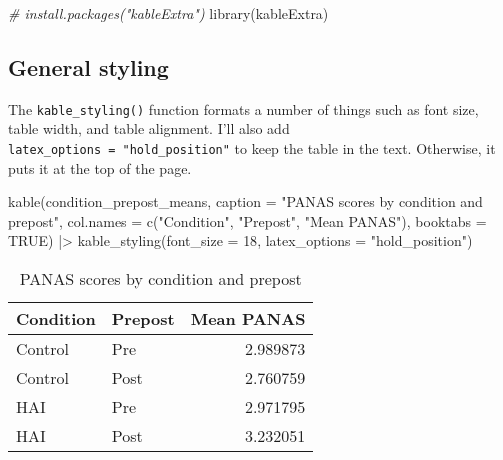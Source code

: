 \documentclass[
  doc]{apa6}
\newenvironment{Shaded}{\begin{snugshade}}{\end{snugshade}}
\newcommand{\AttributeTok}[1]{\textcolor[rgb]{0.77,0.63,0.00}{#1}}
\newcommand{\CommentTok}[1]{\textcolor[rgb]{0.56,0.35,0.01}{\textit{#1}}}
\newcommand{\ConstantTok}[1]{\textcolor[rgb]{0.00,0.00,0.00}{#1}}
\newcommand{\DecValTok}[1]{\textcolor[rgb]{0.00,0.00,0.81}{#1}}
\newcommand{\FunctionTok}[1]{\textcolor[rgb]{0.00,0.00,0.00}{#1}}
\newcommand{\NormalTok}[1]{#1}
\newcommand{\SpecialCharTok}[1]{\textcolor[rgb]{0.00,0.00,0.00}{#1}}
\newcommand{\StringTok}[1]{\textcolor[rgb]{0.31,0.60,0.02}{#1}}
\begin{document}
\begin{Shaded}
\begin{Highlighting}[]
\CommentTok{\# install.packages("kableExtra")}
\FunctionTok{library}\NormalTok{(kableExtra)}
\end{Highlighting}
\end{Shaded}

\hypertarget{general-styling}{%
\subsection{General styling}\label{general-styling}}

The \texttt{kable\_styling()} function formats a number of things such as font size, table width, and table alignment. I'll also add \texttt{latex\_options\ =\ "hold\_position"} to keep the table in the text. Otherwise, it puts it at the top of the page.

\begin{Shaded}
\begin{Highlighting}[]
\FunctionTok{kable}\NormalTok{(condition\_prepost\_means,}
      \AttributeTok{caption =} \StringTok{"PANAS scores by condition and prepost"}\NormalTok{,}
      \AttributeTok{col.names =} \FunctionTok{c}\NormalTok{(}\StringTok{"Condition"}\NormalTok{, }\StringTok{"Prepost"}\NormalTok{, }\StringTok{"Mean PANAS"}\NormalTok{), }
      \AttributeTok{booktabs =} \ConstantTok{TRUE}\NormalTok{) }\SpecialCharTok{|\textgreater{}}
  \FunctionTok{kable\_styling}\NormalTok{(}\AttributeTok{font\_size =} \DecValTok{18}\NormalTok{, }\AttributeTok{latex\_options =} \StringTok{"hold\_position"}\NormalTok{)}
\end{Highlighting}
\end{Shaded}

\begin{table}[!h]

\caption{\label{tab:unnamed-chunk-9}PANAS scores by condition and prepost}
\centering
\fontsize{18}{20}\selectfont
\begin{tabular}[t]{llr}
\toprule
Condition & Prepost & Mean PANAS\\
\midrule
Control & Pre & 2.989873\\
Control & Post & 2.760759\\
HAI & Pre & 2.971795\\
HAI & Post & 3.232051\\
\bottomrule
\end{tabular}
\end{table}
\end{document}

